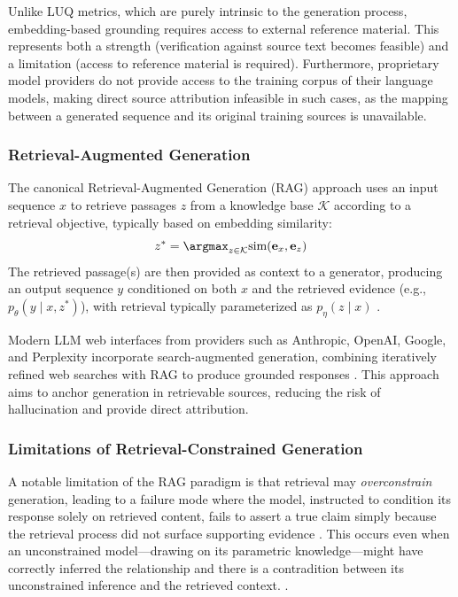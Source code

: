 Unlike LUQ metrics, which are purely intrinsic to the generation process, embedding-based grounding requires access to external reference material. This represents both a strength (verification against source text becomes feasible) and a limitation (access to reference material is required). Furthermore, proprietary model providers do not provide access to the training corpus of their language models, making direct source attribution infeasible in such cases, as the mapping between a generated sequence and its original training sources is unavailable.

\subsubsection{Retrieval-Augmented Generation}

The canonical Retrieval-Augmented Generation (RAG) approach \citep{lewis2020retrieval} uses an input sequence $x$ to retrieve passages $z$ from a knowledge base $\mathcal{K}$ according to a retrieval objective, typically based on embedding similarity:
\begin{equation}
z^* = \argmax_{z \in \mathcal{K}} \text{sim}(\mathbf{e}_x, \mathbf{e}_z)
\end{equation}
The retrieved passage(s) are then provided as context to a generator, producing an output sequence $y$ conditioned on both $x$ and the retrieved evidence (e.g., $p_\theta(y \mid x, z^*)$), with retrieval typically parameterized as $p_\eta(z \mid x)$ \citep{lewis2020retrieval}.

Modern LLM web interfaces from providers such as Anthropic, OpenAI, Google, and Perplexity incorporate search-augmented generation, combining iteratively refined web searches with RAG to produce grounded responses \citep{wu2025clashevalquantifyingtugofwarllms}. This approach aims to anchor generation in retrievable sources, reducing the risk of hallucination and provide direct attribution.

\subsubsection{Limitations of Retrieval-Constrained Generation}

A notable limitation of the RAG paradigm is that retrieval may \textit{overconstrain} generation, leading to a failure mode where the model, instructed to condition its response solely on retrieved content, fails to assert a true claim simply because the retrieval process did not surface supporting evidence \citep{liu2023lostmiddle}. This occurs even when an unconstrained model---drawing on its parametric knowledge---might have correctly inferred the relationship and there is a contradition between its unconstrained inference and the retrieved context. \citep{wu2025clashevalquantifyingtugofwarllms}.

